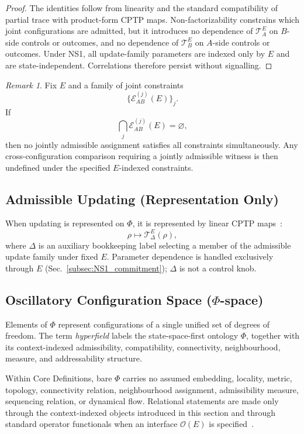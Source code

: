 \documentclass[aps,prx,onecolumn,11pt]{revtex4-2}
\theoremstyle{plain}
\theoremstyle{definition}
\theoremstyle{remark}
\newtheorem{remark}{Remark}
\begin{document}
\begin{proof}
The identities follow from linearity and the standard compatibility of
partial trace with product-form CPTP maps. Non-factorizability
constrains which joint configurations are admitted, but it introduces
no dependence of \(\mathcal{T}^E_A\) on \(B\)-side controls or
outcomes, and no dependence of \(\mathcal{T}^E_B\) on \(A\)-side
controls or outcomes. Under NS1, all update-family parameters are
indexed only by \(E\) and are state-independent. Correlations therefore
persist without signalling.
\end{proof}

\begin{remark}
\label{rem:envelope_nonclosure_exclusion}
Fix \(E\) and a family of joint constraints
\[
\{\mathcal{E}^{(j)}_{AB}(E)\}_j.
\]
If
\[
\bigcap_j \mathcal{E}^{(j)}_{AB}(E)
=
\varnothing,
\]
then no jointly admissible assignment satisfies all constraints
simultaneously. Any cross-configuration comparison requiring a jointly
admissible witness is then undefined under the specified
\(E\)-indexed constraints.
\end{remark}

\subsection{Admissible Updating (Representation Only)}
\label{subsec:admissible_updating_rep_only}

When updating is represented on \(\Phi\), it is represented by linear
CPTP maps~\cite{Kraus1983,NielsenChuang2010,Watrous2018}:
\[
\rho\mapsto\mathcal{T}^E_\Delta(\rho),
\]
where \(\Delta\) is an auxiliary bookkeeping label selecting a member
of the admissible update family under fixed \(E\). Parameter dependence
is handled exclusively through \(E\)
(Sec.~\ref{subsec:NS1_commitment}); \(\Delta\) is not a control knob.

\subsection{Oscillatory Configuration Space (\(\Phi\)-space)}
\label{subsec:phi_space}

Elements of \(\Phi\) represent configurations of a single unified set
of degrees of freedom. The term \emph{hyperfield} labels the
state-space-first ontology \(\Phi\), together with its context-indexed
admissibility, compatibility, connectivity, neighbourhood, measure, and
addressability structure.

Within Core Definitions, bare \(\Phi\) carries no assumed embedding,
locality, metric, topology, connectivity relation, neighbourhood
assignment, admissibility measure, sequencing relation, or dynamical
flow. Relational statements are made only through the context-indexed
objects introduced in this section and through standard operator
functionals when an interface \(\mathcal{O}(E)\) is
specified~\cite{BengtssonZyczkowski2006,BreuerPetruccione2002}.
\end{document}
